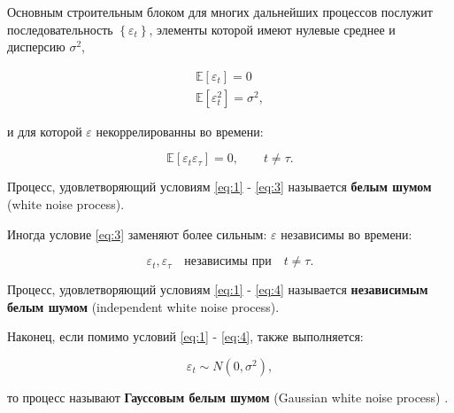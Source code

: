 Основным строительным блоком для многих дальнейших процессов 
послужит последовательность $\left\{ \varepsilon_t \right\}$, 
элементы которой имеют нулевые среднее и дисперсию $\sigma^2$,

\begin{gather}
    \mathbb{E}\left[ \varepsilon_t \right] = 0 \label{eq:1} \\
    \mathbb{E} \left[ \varepsilon_t^2 \right] = \sigma^2, \label{eq:2}
\end{gather}

и для которой $\varepsilon$ некоррелированны во времени:

\begin{equation}
    \mathbb{E} \left[ \varepsilon_t \varepsilon_\tau \right] = 0, \qquad t \neq \tau. \label{eq:3}
\end{equation}

Процесс, удовлетворяющий условиям \eqref{eq:1} - \eqref{eq:3} называется \textbf{белым шумом}
(white noise process).

Иногда условие \eqref{eq:3} заменяют более сильным: $\varepsilon$ 
независимы во времени:

\begin{equation}
    \varepsilon_t, \varepsilon_\tau \quad \text{независимы при} \quad t \neq \tau. \label{eq:4}
\end{equation}

Процесс, удовлетворяющий условиям \eqref{eq:1} - \eqref{eq:4} называется \textbf{независимым 
белым шумом} (independent white noise process).

Наконец, если помимо условий \eqref{eq:1} - \eqref{eq:4}, также выполняется:

\begin{equation*}
    \varepsilon_t \sim N(0, \sigma^2),
\end{equation*}

то процесс называют \textbf{Гауссовым белым шумом} (Gaussian white noise 
process) \cite{TSA_Hamilton}.




